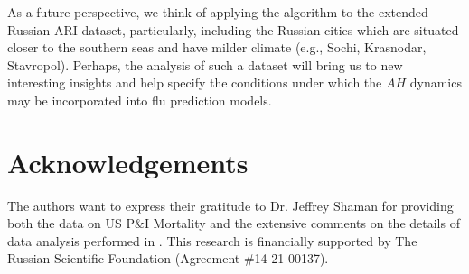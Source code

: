 \documentclass[3p,times,procedia]{elsarticle}
\begin{document}
As a future perspective, we think of applying the algorithm to the extended Russian ARI dataset, particularly, including the Russian cities which are situated closer to the southern seas and have milder climate (e.g., Sochi, Krasnodar, Stavropol). Perhaps, the analysis of such a dataset will bring us to new interesting insights and help specify the conditions under which the $AH$ dynamics may be incorporated into flu prediction models.

\section*{Acknowledgements}

The authors want to express their gratitude to Dr. Jeffrey Shaman for providing both the data on US P\&I Mortality and the extensive comments on the details of data analysis performed in \cite{shaman2010absolute}. This research is financially supported by The Russian Scientific Foundation (Agreement \#14-21-00137).




%
%




 \label{sect:bib}

%
%
%

\end{document}

